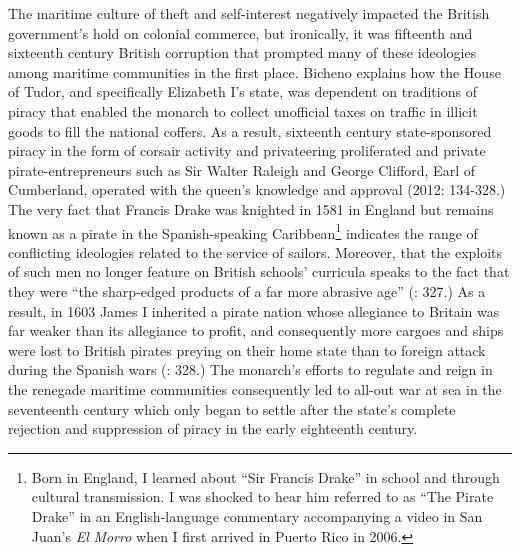 The maritime culture of theft and self-interest negatively impacted the British government’s hold on colonial commerce, but ironically, it was fifteenth and sixteenth century British corruption that prompted many of these ideologies among maritime communities in the first place. Bicheno explains how the House of Tudor, and specifically Elizabeth I’s state, was dependent on traditions of piracy that enabled the monarch to collect unofficial taxes on traffic in illicit goods to fill the national coffers. As a result, sixteenth century state-sponsored piracy in the form of corsair activity and privateering proliferated and private pirate-entrepreneurs such as Sir Walter Raleigh and George Clifford, Earl of Cumberland, operated with the queen’s knowledge and approval (2012: 134-328.) The very fact that Francis Drake was knighted in 1581 in England but remains known as a pirate in the Spanish-speaking Caribbean\footnote{Born in England, I learned about “Sir Francis Drake” in school and through cultural transmission. I was shocked to hear him referred to as “The Pirate Drake” in an English-language commentary accompanying a video in San Juan’s \textit{El} \textit{Morro} when I first arrived in Puerto Rico in 2006.}  indicates the range of conflicting ideologies related to the service of sailors.  Moreover, that the exploits of such men no longer feature on British schools’ curricula speaks to the fact that they were “the sharp-edged products of a far more abrasive age” (\citealt{Bicheno2012}: 327.) As a result, in 1603 James I inherited a pirate nation whose allegiance to Britain was far weaker than its allegiance to profit, and consequently more cargoes and ships were lost to British pirates preying on their home state than to foreign attack during the Spanish wars (\citealt{Bicheno2012}: 328.) The monarch’s efforts to regulate and reign in the renegade maritime communities consequently led to all-out war at sea in the seventeenth century which only began to settle after the state’s complete rejection and suppression of piracy in the early eighteenth century. 

